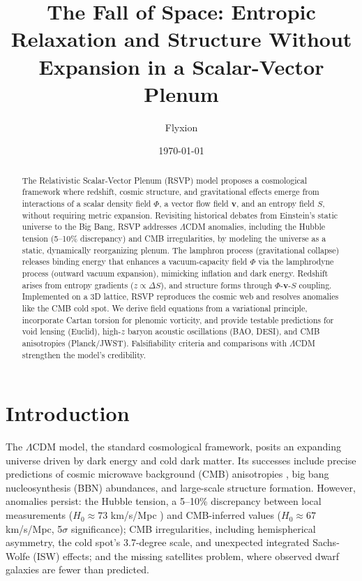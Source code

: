 \documentclass[11pt]{article}
\title{The Fall of Space: Entropic Relaxation and Structure Without Expansion in a Scalar-Vector Plenum}
\author{Flyxion}
\date{\today}
\theoremstyle{plain}
\theoremstyle{definition}
\begin{document}
\maketitle

\begin{abstract}
The Relativistic Scalar-Vector Plenum (RSVP) model proposes a cosmological framework where redshift, cosmic structure, and gravitational effects emerge from interactions of a scalar density field $\Phi$, a vector flow field $\bm{v}$, and an entropy field $S$, without requiring metric expansion. Revisiting historical debates from Einstein’s static universe to the Big Bang, RSVP addresses $\Lambda$CDM anomalies, including the Hubble tension (5–10\% discrepancy) and CMB irregularities, by modeling the universe as a static, dynamically reorganizing plenum. The lamphron process (gravitational collapse) releases binding energy that enhances a vacuum-capacity field $\Phi$ via the lamphrodyne process (outward vacuum expansion), mimicking inflation and dark energy. Redshift arises from entropy gradients ($z \propto \Delta S$), and structure forms through $\Phi$-$\bm{v}$-$S$ coupling. Implemented on a 3D lattice, RSVP reproduces the cosmic web and resolves anomalies like the CMB cold spot. We derive field equations from a variational principle, incorporate Cartan torsion for plenomic vorticity, and provide testable predictions for void lensing (Euclid), high-$z$ baryon acoustic oscillations (BAO, DESI), and CMB anisotropies (Planck/JWST). Falsifiability criteria and comparisons with $\Lambda$CDM strengthen the model’s credibility.
\end{abstract}

\section{Introduction}
The $\Lambda$CDM model, the standard cosmological framework, posits an expanding universe driven by dark energy and cold dark matter. Its successes include precise predictions of cosmic microwave background (CMB) anisotropies \citep{Planck2018}, big bang nucleosynthesis (BBN) abundances, and large-scale structure formation. However, anomalies persist: the Hubble tension, a 5–10\% discrepancy between local measurements ($H_0 \approx 73$ km/s/Mpc \citep{Riess2022}) and CMB-inferred values ($H_0 \approx 67$ km/s/Mpc, 5$\sigma$ significance); CMB irregularities, including hemispherical asymmetry, the cold spot’s 3.7-degree scale, and unexpected integrated Sachs-Wolfe (ISW) effects; and the missing satellites problem, where observed dwarf galaxies are fewer than predicted.
\end{document}
